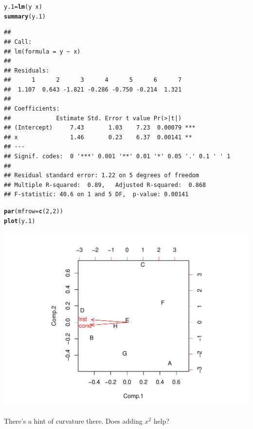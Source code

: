 \documentclass{article}\usepackage[]{graphicx}\usepackage[]{color}
\makeatletter
\def\maxwidth{ %
  \ifdim\Gin@nat@width>\linewidth
    \linewidth
  \else
    \Gin@nat@width
  \fi
}
\newcommand{\hlnum}[1]{\textcolor[rgb]{0.686,0.059,0.569}{#1}}%
\newcommand{\hlopt}[1]{\textcolor[rgb]{0,0,0}{#1}}%
\newcommand{\hlstd}[1]{\textcolor[rgb]{0.345,0.345,0.345}{#1}}%
\newcommand{\hlkwb}[1]{\textcolor[rgb]{0.69,0.353,0.396}{#1}}%
\newcommand{\hlkwc}[1]{\textcolor[rgb]{0.333,0.667,0.333}{#1}}%
\newcommand{\hlkwd}[1]{\textcolor[rgb]{0.737,0.353,0.396}{\textbf{#1}}}%
\newenvironment{kframe}{%
 \def\at@end@of@kframe{}%
 \ifinner\ifhmode%
  \def\at@end@of@kframe{\end{minipage}}%
  \begin{minipage}{\columnwidth}%
 \fi\fi%
 \def\FrameCommand##1{\hskip\@totalleftmargin \hskip-\fboxsep
 \colorbox{shadecolor}{##1}\hskip-\fboxsep
     \hskip-\linewidth \hskip-\@totalleftmargin \hskip\columnwidth}%
 \MakeFramed {\advance\hsize-\width
   \@totalleftmargin\z@ \linewidth\hsize
   \@setminipage}}%
 {\par\unskip\endMakeFramed%
 \at@end@of@kframe}
\newenvironment{knitrout}{}{} %
\makeatother
\begin{document}
\begin{knitrout}
\color{fgcolor}\begin{kframe}
\begin{alltt}
\hlstd{y.1} \hlkwb{=} \hlkwd{lm}\hlstd{(y} \hlopt{~} \hlstd{x)}
\hlkwd{summary}\hlstd{(y.1)}
\end{alltt}
\begin{verbatim}
## 
## Call:
## lm(formula = y ~ x)
## 
## Residuals:
##      1      2      3      4      5      6      7 
##  1.107  0.643 -1.821 -0.286 -0.750 -0.214  1.321 
## 
## Coefficients:
##             Estimate Std. Error t value Pr(>|t|)    
## (Intercept)     7.43       1.03    7.23  0.00079 ***
## x               1.46       0.23    6.37  0.00141 ** 
## ---
## Signif. codes:  0 '***' 0.001 '**' 0.01 '*' 0.05 '.' 0.1 ' ' 1
## 
## Residual standard error: 1.22 on 5 degrees of freedom
## Multiple R-squared:  0.89,	Adjusted R-squared:  0.868 
## F-statistic: 40.6 on 1 and 5 DF,  p-value: 0.00141
\end{verbatim}
\begin{alltt}
\hlkwd{par}\hlstd{(}\hlkwc{mfrow} \hlstd{=} \hlkwd{c}\hlstd{(}\hlnum{2}\hlstd{,} \hlnum{2}\hlstd{))}
\hlkwd{plot}\hlstd{(y.1)}
\end{alltt}
\end{kframe}
\includegraphics[width=\maxwidth]{figure/unnamed-chunk-6} 

\end{knitrout}


There's a hint of curvature there. Does adding $x^2$ help?
\end{document}
